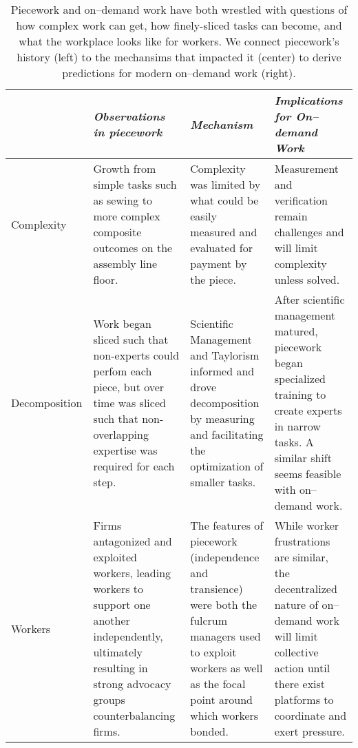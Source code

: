 \documentclass[trackingWork]{subfiles}
\begin{document}
\begin{table*}[t]
  \centering
  \begin{tabularx}{\textwidth}{l X X X}
    \toprule
    & \textit{Observations in piecework} & \textit{Mechanism} & \textit{Implications for On--demand Work} \\
    \midrule
    Complexity &
    \small{Growth from simple tasks such as sewing to more complex composite outcomes on the assembly line floor.} &
    \small{Complexity was limited by what could be easily measured and evaluated for payment by the piece.} &
    \small{Measurement and verification remain challenges and will limit complexity unless solved.} \\ \hline
    
    Decomposition &
    \small{Work began sliced such that non-experts could perfom each piece, but over time was sliced such that non-overlapping expertise was required for each step.} &
    \small{Scientific Management and Taylorism informed and drove decomposition by measuring and facilitating the optimization of smaller tasks.} &
    \small{After scientific management matured, piecework began  specialized training to create experts in narrow tasks. A similar shift seems feasible with on--demand work.} \\ \hline
    
    Workers &
    \small{Firms antagonized and exploited workers, leading workers to support one another independently, ultimately resulting in strong advocacy groups counterbalancing firms.} &
    \small{The features of piecework (independence and transience) were both the fulcrum managers used to exploit workers as well as the focal point around which workers bonded.} &
    \small{While worker frustrations are similar, the decentralized nature of on--demand work will limit collective action until there exist platforms to coordinate and exert pressure.} \\ 
    \bottomrule
  \end{tabularx}
  \caption{Piecework and on--demand work have both wrestled with questions of how complex work can get, how finely-sliced tasks can become, and what the workplace looks like for workers. We connect piecework's history (left) to the mechansims that impacted it (center) to derive predictions for modern on--demand work (right). }
\end{table*}
\end{document}

